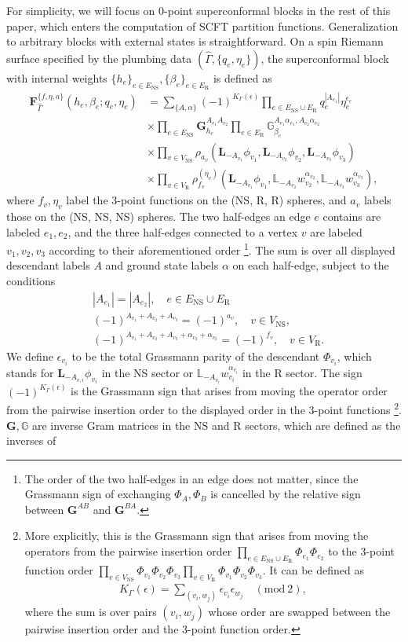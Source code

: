 \documentclass[12pt]{article}
\def\ie{\begin{equation}\begin{aligned}}
\def\fe{\end{aligned}\end{equation}}
\def\NS{\mathrm{NS}}
\def\R{\mathrm{R}}
\begin{document}
For simplicity, we will focus on 0-point superconformal blocks in the rest of this paper, which enters the computation of SCFT partition functions. Generalization to arbitrary blocks with external states is straightforward. On a spin Riemann surface specified by the plumbing data $(\hat{\Gamma}, \{q_e, \eta_e\})$, the superconformal block with internal weights $\{h_e\}_{e\in E_{\NS}}, \{\beta_e\}_{e\in E_\R}$ is defined as
\ie \label{scblock}
\mathbf{F}{}^{\{f, \eta, a\}}_{\hat{\Gamma}}(h_e, \beta_e; q_e, \eta_e) &= \sum_{\{A, \alpha\}}(-1)^{K_{\Gamma}(\epsilon)} \prod_{e\in E_\NS\cup E_\R} q_e^{|A_{e_1}|}\eta_e^{\epsilon_e}\\
&\times \prod_{e\in E_\NS} \mathbf{G}_{h_e}^{A_{e_1}A_{e_2}} \prod_{e\in E_\R} \mathbb{G}_{\beta_e}^{A_{e_1}\alpha_{e_1},A_{e_2}\alpha_{e_2}}\\
&\times \prod_{v \in V_\NS} \rho_{a_v}(\mathbf L_{-A_{v_1}}\phi_{v_1},\mathbf L_{-A_{v_2}}\phi_{v_2},\mathbf L_{-A_{v_3}}\phi_{v_3})\\
&\times\prod_{v\in V_\R}\rho_{f_v}^{(\eta_v)}(\mathbf L_{-A_{v_1}}\phi_{v_1},\mathbb L_{-A_{v_2}}w_{v_2}^{\alpha_{v_2}},\mathbb L_{-A_{v_3}}w_{v_3}^{\alpha_{v_3}}),
\fe
where $f_v, \eta_v$ label the 3-point functions on the (NS, R, R) spheres, and $a_v$ labels those on the (NS, NS, NS) spheres. The two half-edges an edge $e$ contains are labeled $e_1, e_2$, and the three half-edges connected to a vertex $v$ are labeled $v_1, v_2, v_3$ according to their aforementioned order \footnote{The order of the two half-edges in an edge does not matter, since the Grassmann sign of exchanging $\Phi_A, \Phi_B$ is cancelled by the relative sign between $\mathbf{G}^{AB}$ and $\mathbf{G}^{BA}$.}. The sum is over all displayed descendant labels $A$ and ground state labels $\alpha$ on each half-edge, subject to the conditions
\ie \label{selection}
&|A_{e_1}| = |A_{e_2}|,\quad e\in E_{\NS}\cup E_\R\\
&(-1)^{A_{v_1}+A_{v_2}+A_{v_3}}=(-1)^{a_v},\quad v\in V_\NS,\\
&(-1)^{A_{v_1}+A_{v_2}+A_{v_3}+\alpha_{v_2}+\alpha_{v_3}}=(-1)^{f_v},\quad v\in V_\R.
\fe
We define $\epsilon_{v_i}$ to be the total Grassmann parity of the descendant $\Phi_{v_i}$, which stands for $\mathbf{L}_{-A_{v,i}}\phi_{v_i}$ in the NS sector or $\mathbb{L}_{-A_{v_i}}w_{v_i}^{\alpha_{v_i}}$ in the R sector. The sign $(-1)^{K_\Gamma(\epsilon)}$ is the Grassmann sign that arises from moving the operator order from the pairwise insertion order to the displayed order in the 3-point functions \footnote{More explicitly, this is the Grassmann sign that arises from moving the operators from the pairwise insertion order $\prod_{e\in E_\NS\cup E_\R}\Phi_{e_1}\Phi_{e_2}$ to the 3-point function order $\prod_{v\in V_\NS}\Phi_{v_1}\Phi_{v_2}\Phi_{v_3}\prod_{v\in V_\R}\Phi_{v_1}\Phi_{v_2}\Phi_{v_3}$. It can be defined as 
\ie
K_\Gamma(\epsilon)=\sum_{(v_i, w_j)}\epsilon_{v_i}\epsilon_{w_j} \quad (\mathrm{mod}\ 2),
\fe 
where the sum is over pairs $(v_i, w_j)$ whose order are swapped between the pairwise insertion order and the 3-point function order.}. $\mathbf{G}, \mathbb{G}$ are inverse Gram matrices in the NS and R sectors, which are defined as the inverses of
\end{document}
